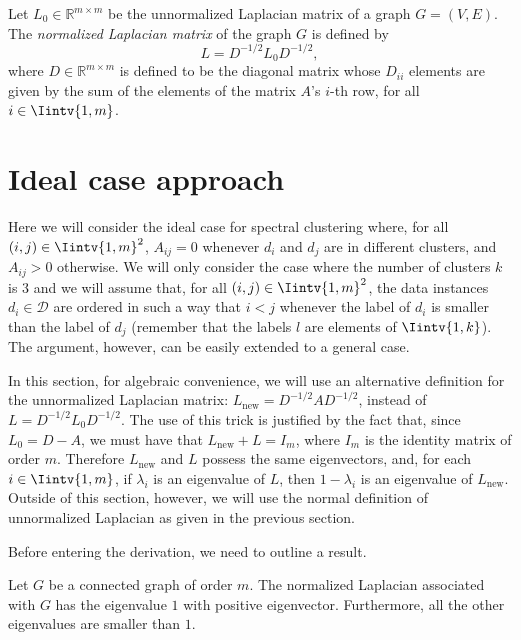 \begin{definition}\label{unnormalized}
   Let $L_0 \in \mathbb R ^{m \times m}$ be the unnormalized Laplacian matrix of a graph $G = (V, E)$. The \textit{normalized Laplacian matrix} of the graph $G$ is defined by
   \begin{equation}
      L = D^{-1/2}L_0D^{-1/2},
   \end{equation}
   where $D \in \mathbb R ^{m \times m}$ is defined to be the diagonal matrix whose $D_{ii}$ elements are given by the sum of the elements of the matrix $A$'s $i$-th row, for all $i \in \Iintv{1,m}$. 
\end{definition}

\section{Ideal case approach}
Here we will consider the ideal case for spectral clustering where, for all $(i,j) \in \Iintv{1,m}^2$, $A_{ij} = 0$ whenever $d_i$ and $d_j$ are in different clusters, and $A_{ij} > 0$ otherwise.
We will only consider the case where the number of clusters $k$ is $3$ and we will assume that, for all $(i,j) \in \Iintv{1,m}^2$, the data instances $d_i \in \mathcal D$ are ordered in such a way that $i < j$ whenever the label of $d_i$ is smaller than the label of $d_j$ (remember that the labels $l$ are elements of $\Iintv{1,k}$).
The argument, however, can be easily extended to a general case.

In this section, for algebraic convenience, we will use an alternative definition for the unnormalized Laplacian matrix: $L_{\text{new}} = D^{-1/2}AD^{-1/2}$, instead of $L = D^{-1/2}L_0D^{-1/2}$.
The use of this trick is justified by the fact that, since $L_0 = D - A$, we must have that $L_{\text{new}} + L = I_m$, where $I_m$ is the identity matrix of order $m$.
Therefore $L_{\text{new}}$ and $L$ possess the same eigenvectors, and, for each $i \in \Iintv{1,m}$, if $\lambda _i$ is an eigenvalue of $L$, then $1 - \lambda _i$ is an eigenvalue of $L_{\text{new}}$. 
Outside of this section, however, we will use the normal definition of unnormalized Laplacian as given in the previous section.

Before entering the derivation, we need to outline a result.

\begin{proposition}
   \label{bigeigenvalue}
   Let $G$ be a connected graph of order $m$.
   The normalized Laplacian associated with $G$ has the eigenvalue $1$ with positive eigenvector.
   Furthermore, all the other eigenvalues are smaller than $1$.
\end{proposition}

